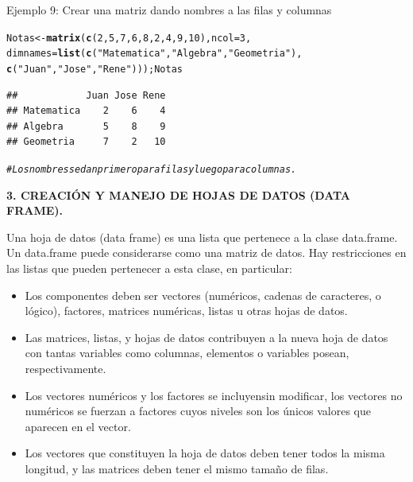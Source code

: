 \documentclass[12pt,letterpaper]{article}\usepackage[]{graphicx}\usepackage[]{color}
\makeatletter
\newcommand{\hlnum}[1]{\textcolor[rgb]{0.686,0.059,0.569}{#1}}%
\newcommand{\hlstr}[1]{\textcolor[rgb]{0.192,0.494,0.8}{#1}}%
\newcommand{\hlcom}[1]{\textcolor[rgb]{0.678,0.584,0.686}{\textit{#1}}}%
\newcommand{\hlstd}[1]{\textcolor[rgb]{0.345,0.345,0.345}{#1}}%
\newcommand{\hlkwb}[1]{\textcolor[rgb]{0.69,0.353,0.396}{#1}}%
\newcommand{\hlkwc}[1]{\textcolor[rgb]{0.333,0.667,0.333}{#1}}%
\newcommand{\hlkwd}[1]{\textcolor[rgb]{0.737,0.353,0.396}{\textbf{#1}}}%
\newenvironment{kframe}{%
 \def\at@end@of@kframe{}%
 \ifinner\ifhmode%
  \def\at@end@of@kframe{\end{minipage}}%
  \begin{minipage}{\columnwidth}%
 \fi\fi%
 \def\FrameCommand##1{\hskip\@totalleftmargin \hskip-\fboxsep
 \colorbox{shadecolor}{##1}\hskip-\fboxsep
     \hskip-\linewidth \hskip-\@totalleftmargin \hskip\columnwidth}%
 \MakeFramed {\advance\hsize-\width
   \@totalleftmargin\z@ \linewidth\hsize
   \@setminipage}}%
 {\par\unskip\endMakeFramed%
 \at@end@of@kframe}
\newenvironment{knitrout}{}{} %
\makeatother
\begin{document}
Ejemplo 9: Crear una matriz dando nombres a las filas y columnas
\begin{knitrout}
\color{fgcolor}\begin{kframe}
\begin{alltt}
\hlstd{Notas} \hlkwb{<-} \hlkwd{matrix}\hlstd{(}\hlkwd{c}\hlstd{(}\hlnum{2}\hlstd{,} \hlnum{5}\hlstd{,} \hlnum{7}\hlstd{,} \hlnum{6}\hlstd{,} \hlnum{8}\hlstd{,} \hlnum{2}\hlstd{,} \hlnum{4}\hlstd{,} \hlnum{9}\hlstd{,} \hlnum{10}\hlstd{),} \hlkwc{ncol}\hlstd{=}\hlnum{3}\hlstd{,}
\hlkwc{dimnames}\hlstd{=}\hlkwd{list}\hlstd{(}\hlkwd{c}\hlstd{(}\hlstr{"Matematica"}\hlstd{,}\hlstr{"Algebra"}\hlstd{,}\hlstr{"Geometria"}\hlstd{),}
\hlkwd{c}\hlstd{(}\hlstr{"Juan"}\hlstd{,}\hlstr{"Jose"}\hlstd{,}\hlstr{"Rene"}\hlstd{))); Notas}
\end{alltt}
\begin{verbatim}
##            Juan Jose Rene
## Matematica    2    6    4
## Algebra       5    8    9
## Geometria     7    2   10
\end{verbatim}
\begin{alltt}
\hlcom{# Los nombres se dan primero para filas y luego para columnas.}
\end{alltt}
\end{kframe}
\end{knitrout}

\begin{center}
\textbf{3.  CREACI\'ON Y MANEJO DE HOJAS DE DATOS (DATA FRAME).}
\end{center}

Una hoja de datos (data frame) es una lista que pertenece a la clase data.frame.
Un data.frame puede considerarse como una matriz de datos. Hay restricciones en
las listas que pueden pertenecer a esta clase, en particular: 

\begin{itemize}
\item Los componentes deben ser vectores (num\'ericos, cadenas de caracteres, o  l\'ogico), factores, matrices num\'ericas, listas u otras hojas de datos.
\item Las matrices, listas, y hojas de datos contribuyen a la nueva hoja de datos con tantas variables como columnas, elementos o variables posean, respectivamente.
\item Los vectores num\'ericos y los factores se incluyensin modificar, los vectores no num\'ericos se fuerzan a factores cuyos niveles son los \'unicos valores que aparecen en el vector.
\item Los vectores que constituyen la hoja de datos deben tener todos la misma longitud, y las matrices deben tener el mismo tama\~no de filas.
\end{itemize}
\end{document}
